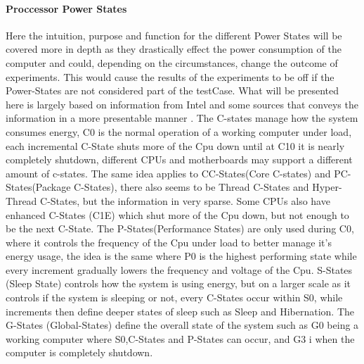 \paragraph{Proccessor Power States}
Here the intuition, purpose and function for the different Power States will be covered more in depth as they drastically effect the power consumption of the computer and could, depending on the circumstances, change the outcome of experiments. This would cause the results of the experiments to be off if the Power-States are not considered part of the testCase. What will be presented here is largely based on information from Intel and some sources that conveys the information\cite{CIntel} in a more presentable manner \cite{CMete,CLinux}. The C-states manage how the system consumes energy, C0 is the normal operation of a working computer under load, each incremental C-State shuts more of the Cpu down until at C10 it is nearly completely shutdown, different CPUs and motherboards may support a different amount of c-states. The same idea applies to CC-States(Core C-states) and PC-States(Package C-States), there also seems to be Thread C-States and Hyper-Thread C-States, but the information in very sparse. Some CPUs also have enhanced C-States (C1E) which shut more of the Cpu down, but not enough to be the next C-State. The P-States(Performance States) are only used during C0, where it controls the frequency of the Cpu under load to better manage it's energy usage, the idea is the same where P0 is the highest performing state while every increment gradually lowers the frequency and voltage of the Cpu. S-States (Sleep State) controls how the system is using energy, but on a larger scale as it controls if the system is sleeping or not, every C-States occur within S0, while increments then define deeper states of sleep such as Sleep and Hibernation. The G-States (Global-States) define the overall state of the system such as G0 being a working computer where S0,C-States and P-States can occur, and G3 i when the computer is completely shutdown.
